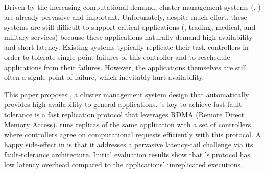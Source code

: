 
Driven by the increasing computational demand, cluster management systems (\eg, 
\mesos) are already pervasive and important. Unforunately, despite much effort, 
these systems are still difficult to support critical applications (\eg, 
trading, medical, and military services) because these applications naturally 
demand high-availability and short latency. Existing systems typically 
replicate their task controllers in order to tolerate single-point failures of 
this controller and to reschedule applications from their failures. However, 
the applications themselves are still often a signle point of failure, which 
inevitably hurt availability.


This paper proposes \xxx, a cluster management system design that automatically 
provides high-availability to general applications. \xxx's key to achieve fast 
fault-tolerance is a fast \paxos replication protocol that leverages RDMA 
(Remote Direct Memory Access). \xxx runs replicas of the same application with 
a set of controllers, where controllers agree on computational requests 
efficiently with this protocol. A happy side-effect in \xxx is that it 
addresses a pervasive latency-tail challenge via its fault-tolerance 
architecture. Initial evaluation results show that \xxx's protocol has low 
latency overhead compared to the applications' unreplicated executions.


